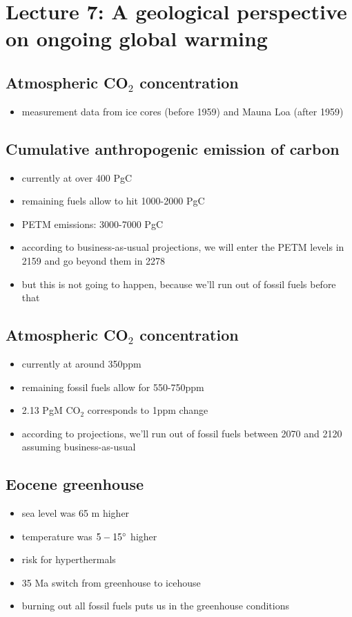 \section{Lecture 7: A geological perspective on ongoing global warming}

\subsection{Atmospheric CO$_2$ concentration}

\begin{itemize}
	\item measurement data from ice cores (before 1959) and Mauna Loa
	(after 1959)
\end{itemize}

\subsection{Cumulative anthropogenic emission of carbon}
\begin{itemize}
	\item currently at over 400 PgC
	\item remaining fuels allow to hit 1000-2000 PgC
	\item PETM emissions: 3000-7000 PgC
	\item according to business-as-usual projections, we will enter the
	PETM levels in 2159 and go beyond them in 2278
	\item but this is not going to happen, because we'll run out of
	fossil fuels before that
\end{itemize}

\subsection{Atmospheric CO$_2$ concentration}
\begin{itemize}
	\item currently at around 350ppm
	\item remaining fossil fuels allow for 550-750ppm
	\item 2.13 PgM CO$_2$ corresponds to 1ppm change
	\item according to projections, we'll run out of fossil fuels between
	2070 and 2120 assuming business-as-usual
\end{itemize}

\subsection{Eocene greenhouse}
\begin{itemize}
	\item sea level was 65 m higher
	\item temperature was $5-15\degree$ higher
	\item risk for hyperthermals
	\item 35 Ma switch from greenhouse to icehouse
	\item burning out all fossil fuels puts us in the greenhouse conditions
\end{itemize}

